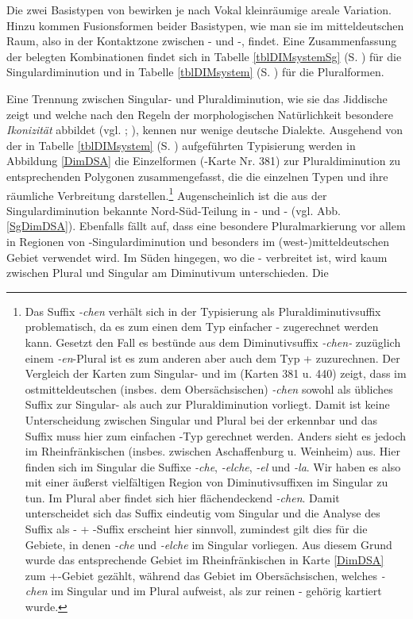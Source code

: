    
  Die zwei Basistypen von  bewirken je nach Vokal kleinräumige areale Variation. Hinzu kommen Fusionsformen beider Basistypen, wie man sie im mitteldeutschen Raum, also in der Kontaktzone zwischen - und -, findet. Eine Zusammenfassung der belegten Kombinationen findet sich in Tabelle \ref{tblDIMsystemSg} (S. \pageref{tblDIMsystemSg}) für die Singulardiminution und in Tabelle \ref{tblDIMsystem} (S. \pageref{tblDIMsystem}) für die Pluralformen.  
 
	Eine Trennung zwischen Singular- und Pluraldiminution, wie sie das Jiddische zeigt und welche nach den Regeln der morphologischen Natürlichkeit besondere \textit{Ikonizität} abbildet (vgl. \cite[insbes. 98–102]{Mayerthaler1981}; \cite[insbes. 59]{Wurzel1984}), kennen nur wenige deutsche Dialekte. Ausgehend von der in Tabelle \ref{tblDIMsystem} (S. \pageref{tblDIMsystem}) aufgeführten Typisierung werden in Abbildung \ref{DimDSA}  die Einzelformen (-Karte Nr. 381) zur Pluraldiminution zu entsprechenden Polygonen zusammengefasst, die die einzelnen Typen und ihre räumliche Verbreitung darstellen.\footnote{Das Suffix \textit{-chen} verhält sich in der Typisierung als Pluraldiminutivsuffix problematisch, da es zum einen dem Typ einfacher - zugerechnet werden kann. Gesetzt den Fall es bestünde aus dem Diminutivsuffix \textit{-chen-} zuzüglich einem  \textit{-en}-Plural ist es zum anderen aber auch dem Typ + zuzurechnen. Der Vergleich der Karten zum Singular- und  im  (Karten 381 u. 440) zeigt, dass im ostmitteldeutschen (insbes. dem Obersächsischen) \textit{-chen} sowohl als übliches Suffix zur Singular- als auch zur Pluraldiminution vorliegt. Damit ist keine Unterscheidung zwischen Singular und Plural bei der  erkennbar und das Suffix muss hier  zum einfachen -Typ gerechnet werden. Anders sieht es jedoch im Rheinfränkischen (insbes. zwischen Aschaffenburg u.  Weinheim) aus. Hier finden sich im Singular die Suffixe \textit{-che}, \textit{-elche}, \textit{-el} und \textit{-la}. Wir haben es also mit einer äußerst vielfältigen Region von Diminutivsuffixen im Singular zu tun. Im Plural aber findet sich hier flächendeckend \textit{-chen}. Damit unterscheidet sich das Suffix eindeutig vom Singular und die Analyse des Suffix als - + -Suffix erscheint hier sinnvoll, zumindest gilt dies für die Gebiete, in denen \textit{-che} und \textit{-elche} im Singular vorliegen. Aus diesem Grund wurde das entsprechende Gebiet im Rheinfränkischen in Karte \ref{DimDSA} zum +-Gebiet gezählt, während das Gebiet im Obersächsischen, welches \textit{-chen} im Singular und im Plural aufweist, als zur reinen - gehörig kartiert wurde.} Augenscheinlich ist die aus der Singulardiminution bekannte Nord-Süd-Teilung in - und - (vgl. Abb. \ref{SgDimDSA}). Ebenfalls fällt auf, dass eine besondere Pluralmarkierung vor allem in Regionen von -Singulardiminution und besonders im (west-)mitteldeutschen Gebiet verwendet wird. Im Süden hingegen, wo die - verbreitet ist, wird kaum zwischen Plural und Singular am Diminutivum unterschieden. Die 